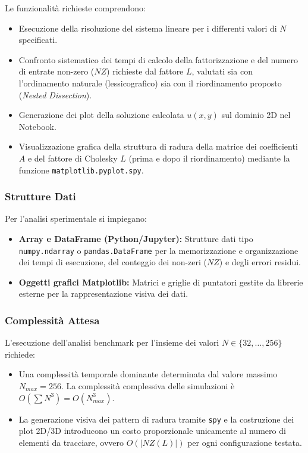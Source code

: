\documentclass[twocolumn]{article}
\begin{document}
Le funzionalit\`a richieste comprendono:
\begin{itemize}
    \item Esecuzione della risoluzione del sistema lineare per i differenti valori di $N$ specificati.
    \item Confronto sistematico dei tempi di calcolo della fattorizzazione e del numero di entrate non-zero ($NZ$) richieste dal fattore $L$, valutati sia con l'ordinamento naturale (lessicografico) sia con il riordinamento proposto (\textit{Nested Dissection}).
    \item Generazione dei plot della soluzione calcolata $u(x,y)$ sul dominio 2D nel Notebook.
    \item Visualizzazione grafica della struttura di radura della matrice dei coefficienti $A$ e del fattore di Cholesky $L$ (prima e dopo il riordinamento) mediante la funzione \texttt{matplotlib.pyplot.spy}.
\end{itemize}

\subsubsection{Strutture Dati}
Per l'analisi sperimentale si impiegano:
\begin{itemize}
    \item \textbf{Array e DataFrame (Python/Jupyter):} Strutture dati tipo \texttt{numpy.ndarray} o \texttt{pandas.DataFrame} per la memorizzazione e organizzazione dei tempi di esecuzione, del conteggio dei non-zeri ($NZ$) e degli errori residui.
    \item \textbf{Oggetti grafici Matplotlib:} Matrici e griglie di puntatori gestite da librerie esterne per la rappresentazione visiva dei dati.
\end{itemize}

\subsubsection{Complessit\`a Attesa}
L'esecuzione dell'analisi benchmark per l'insieme dei valori $N \in \{32, \dots, 256\}$ richiede:
\begin{itemize}
    \item Una complessit\`a temporale dominante determinata dal valore massimo $N_{max} = 256$. La complessit\`a complessiva delle simulazioni \`e $O(\sum N^3) = O(N_{max}^3)$.
    \item La generazione visiva dei pattern di radura tramite \texttt{spy} e la costruzione dei plot 2D/3D introducono un costo proporzionale unicamente al numero di elementi da tracciare, ovvero $O(|NZ(L)|)$ per ogni configurazione testata.
\end{itemize}
\end{document}
